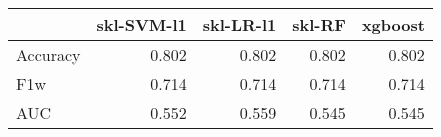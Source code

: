\begin{tabular}{lrrrr}
\toprule
{} &  skl-SVM-l1 &  skl-LR-l1 &  skl-RF &  xgboost \\
\midrule
Accuracy &       0.802 &      0.802 &   0.802 &    0.802 \\
F1w      &       0.714 &      0.714 &   0.714 &    0.714 \\
AUC      &       0.552 &      0.559 &   0.545 &    0.545 \\
\bottomrule
\end{tabular}
